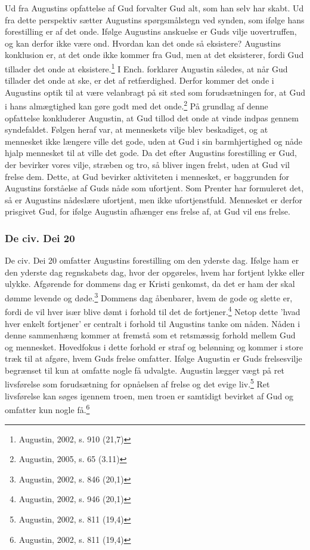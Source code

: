 Ud fra Augustins opfattelse af Gud forvalter Gud alt, som han selv har skabt. Ud fra dette perspektiv sætter Augustins spørgsmålstegn ved synden, som ifølge hans forestilling er af det onde. Ifølge Augustins anskuelse er Guds vilje uovertruffen, og kan derfor ikke være ond.  Hvordan kan det onde så eksistere? Augustins konklusion er, at det onde ikke kommer fra Gud, men at det eksisterer, fordi Gud tillader det onde at eksistere.\footnote{Augustin, 2002, s. 910 (21,7)} I Ench. forklarer Augustin således, at når Gud tillader det onde at ske, er det af retfærdighed. Derfor kommer det onde i Augustins optik til at være velanbragt på sit sted som forudsætningen for, at Gud i hans almægtighed kan gøre godt med det onde.\footnote{Augustin, 2005, s. 65 (3.11) } På grundlag af denne opfattelse konkluderer Augustin, at Gud tillod det onde at vinde indpas gennem syndefaldet. Følgen heraf var, at menneskets vilje blev beskadiget, og at mennesket ikke længere ville det gode, uden at Gud i sin barmhjertighed og nåde hjalp mennesket til at ville det gode. Da det efter Augustins forestilling er Gud, der bevirker vores vilje, stræben og tro, så bliver ingen frelst, uden at Gud vil frelse dem. Dette, at Gud bevirker aktiviteten i mennesket, er baggrunden for Augustins forståelse af Guds nåde som ufortjent. Som Prenter har formuleret det, så er Augustins nådeslære ufortjent, men ikke ufortjenstfuld. Mennesket er derfor prisgivet Gud, for ifølge Augustin afhænger ens frelse af, at Gud vil ens frelse.

\subsubsection{De civ. Dei 20}
De civ. Dei 20 omfatter Augustins forestilling om den yderste dag. Ifølge ham er den yderste dag regnskabets dag, hvor der opgøreles, hvem har fortjent lykke eller ulykke. Afgørende for dommens dag er Kristi genkomst, da det er ham der skal dømme levende og døde.\footnote{Augustin, 2002, s. 846 (20,1)} Dommens dag åbenbarer, hvem de gode og slette er, fordi de vil hver især blive dømt i forhold til det de fortjener.\footnote{Augustin, 2002, s. 946 (20,1)} Netop dette 'hvad hver enkelt fortjener' er centralt i forhold til Augustins tanke om nåden. Nåden i denne sammenhæng kommer at fremstå som et retsmæssig forhold mellem Gud og mennesket. Hovedfokus i dette forhold er straf og belønning og kommer i store træk til at afgøre, hvem Guds frelse omfatter. Ifølge Augustin er Guds frelsesvilje begrænset til kun at omfatte nogle få udvalgte. Augustin lægger vægt på ret livsførelse som forudsætning for opnåelsen af frelse og det evige liv.\footnote{Augustin, 2002, s. 811 (19,4)} Ret livsførelse kan søges igennem troen, men troen er samtidigt bevirket af Gud og omfatter kun nogle få.\footnote{Augustin, 2002, s. 811 (19,4)}

